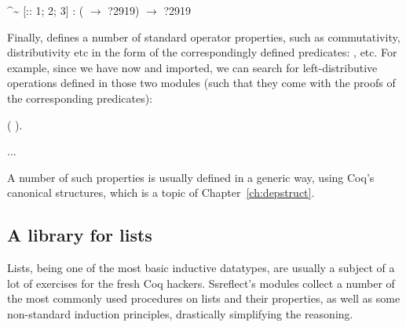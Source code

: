 \coqdoceol
\coqdocemptyline
\coqdocnoindent
{}\^{}\~{} [:: 1; 2; 3]\coqdoceol
\coqdocindent{2.50em}
: ( \ensuremath{\rightarrow} ?2919) \ensuremath{\rightarrow}  ?2919

\coqdocemptyline


Finally,  defines a number of standard operator properties,
such as commutativity, distributivity etc in the form of the
correspondingly defined predicates: , 
etc. For example, since we have now  and  imported,
we can search for left-distributive operations defined in those two
modules (such that they come with the proofs of the corresponding
predicates):


\begin{coqdoccode}
\coqdocemptyline
\coqdocnoindent
{} \coqdocvar{\_} ( \coqdocvar{\_}).\coqdoceol
\coqdocemptyline
\end{coqdoccode}


\coqdoceol
\coqdocemptyline
\coqdocnoindent
{}    \coqdoceol
\coqdocnoindent
{}    \coqdoceol
\coqdocnoindent
{}    \coqdoceol
\coqdocnoindent
{}    \coqdoceol
\coqdocnoindent
{}    \coqdoceol
\coqdocnoindent
...

\coqdocemptyline


A number of such properties is usually defined in a generic way, using
Coq's canonical structures, which is a topic of
Chapter~\ref{ch:depstruct}.


\subsection{A library for lists}


\label{sec:liblists}


Lists, being one of the most basic inductive datatypes, are usually a
subject of a lot of exercises for the fresh Coq hackers. Ssreflect's
modules   collect a number of the most commonly used
procedures on lists and their properties, as well as some non-standard
induction principles, drastically simplifying the reasoning.


